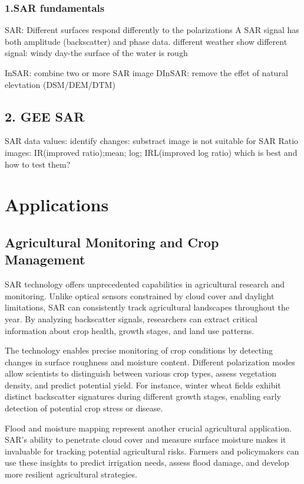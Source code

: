 \documentclass[
  letterpaper,
]{scrbook}
\begin{document}
\subsubsection{1.SAR fundamentals}\label{sar-fundamentals}

SAR: Different surfaces respond differently to the polarizations A SAR
signal has both amplitude (backscatter) and phase data. different
weather show different signal: windy day-the surface of the water is
rough

InSAR: combine two or more SAR image DInSAR: remove the effet of natural
elevtation (DSM/DEM/DTM)

\subsection{2. GEE SAR}\label{gee-sar}

SAR data values: identify changes: substract image is not suitable for
SAR Ratio images: IR(improved ratio);mean; log; IRL(improved log ratio)
which is best and how to test them?

\section{Applications}\label{applications-6}

\subsection{Agricultural Monitoring and Crop
Management}\label{agricultural-monitoring-and-crop-management}

SAR technology offers unprecedented capabilities in agricultural
research and monitoring. Unlike optical sensors constrained by cloud
cover and daylight limitations, SAR can consistently track agricultural
landscapes throughout the year. By analyzing backscatter signals,
researchers can extract critical information about crop health, growth
stages, and land use patterns.

The technology enables precise monitoring of crop conditions by
detecting changes in surface roughness and moisture content. Different
polarization modes allow scientists to distinguish between various crop
types, assess vegetation density, and predict potential yield. For
instance, winter wheat fields exhibit distinct backscatter signatures
during different growth stages, enabling early detection of potential
crop stress or disease.

Flood and moisture mapping represent another crucial agricultural
application. SAR's ability to penetrate cloud cover and measure surface
moisture makes it invaluable for tracking potential agricultural risks.
Farmers and policymakers can use these insights to predict irrigation
needs, assess flood damage, and develop more resilient agricultural
strategies.
\end{document}
